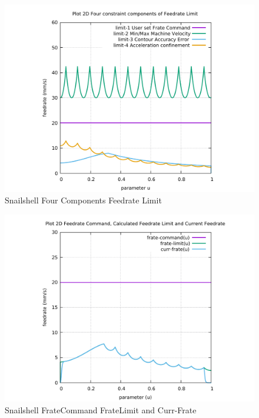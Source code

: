 \begin{figure}
	\caption     {Snailshell Four Components Feedrate Limit}
	\label{10-img-Snailshell-Four-Components-Feedrate-Limit.pdf}
	\includegraphics[width=1.00\textwidth]{Chap4/appendix/app-Snailshell/plots/10-img-Snailshell-Four-Components-Feedrate-Limit.pdf}
\end{figure}

\clearpage
\pagebreak

\begin{figure}
	\caption     {Snailshell FrateCommand FrateLimit and Curr-Frate}
	\label{11-img-Snailshell-FrateCommand-FrateLimit-and-Curr-Frate.pdf}
	\includegraphics[width=1.00\textwidth]{Chap4/appendix/app-Snailshell/plots/11-img-Snailshell-FrateCommand-FrateLimit-and-Curr-Frate.pdf}
\end{figure}

